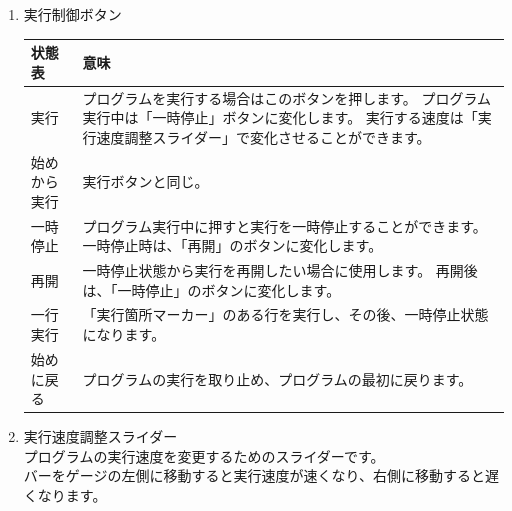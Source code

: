 \documentclass[11pt,a4j]{jarticle}
\begin{document}
\begin{enumerate}
\begin{enumerate} \itemsep 0pt  \parskip 0pt
\item 実行制御ボタン
\begin{table}[htbp]
  \vspace{-0.3cm}
  \begin{center}
    \begin{tabular}{l|p{11.0cm}} \hline
	状態表		& 意味 \\ \hline
	実行		&
                  プログラムを実行する場合はこのボタンを押します。
                  プログラム実行中は「一時停止」ボタンに変化します。
                  実行する速度は「実行速度調整スライダー」で変化させることができます。 \\ \hline
    始めから実行&
                  実行ボタンと同じ。 \\ \hline
    一時停止	&
                  プログラム実行中に押すと実行を一時停止することができます。
                  一時停止時は、「再開」のボタンに変化します。 \\ \hline
    再開		&
                  一時停止状態から実行を再開したい場合に使用します。
                  再開後は、「一時停止」のボタンに変化します。 \\ \hline
	一行実行	&
	              「実行箇所マーカー」のある行を実行し、その後、一時停止状態になります。 \\ \hline
	始めに戻る	&
	              プログラムの実行を取り止め、プログラムの最初に戻ります。 \\ \hline
    \end{tabular}
  \end{center}
  \vspace{-0.7cm}
\end{table}

\vspace{0.2cm}

\item 実行速度調整スライダー \\
プログラムの実行速度を変更するためのスライダーです。 \\
バーをゲージの左側に移動すると実行速度が速くなり、右側に移動すると遅くなります。

\vspace{0.2cm}


\end{enumerate}
\end{enumerate}
\end{document}
